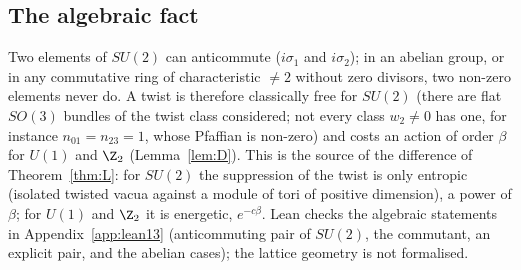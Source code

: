\subsection{The algebraic fact}
Two elements of $SU(2)$ can anticommute ($i\sigma_1$ and $i\sigma_2$); in an abelian group, or in any commutative ring of characteristic $\ne2$ without zero divisors, two non-zero elements never do. A twist is therefore classically free for $SU(2)$ (there are flat $SO(3)$ bundles of the twist class considered; not every class $w_2\ne0$ has one, for instance $n_{01}=n_{23}=1$, whose Pfaffian is non-zero) and costs an action of order $\beta$ for $U(1)$ and $\Z_2$ (Lemma~\ref{lem:D}). This is the source of the difference of Theorem~\ref{thm:L}: for $SU(2)$ the suppression of the twist is only entropic (isolated twisted vacua against a module of tori of positive dimension), a power of $\beta$; for $U(1)$ and $\Z_2$ it is energetic, $e^{-c\beta}$. Lean checks the algebraic statements in Appendix~\ref{app:lean13} (anticommuting pair of $SU(2)$, the commutant, an explicit pair, and the abelian cases); the lattice geometry is not formalised.

